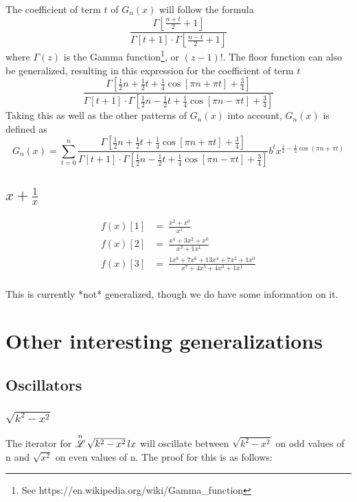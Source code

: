 \documentclass[12pt, letterpaper]{article}
\begin{document}
The coefficient of term $t$ of $G_n(x)$ will follow the formula
$$\frac{\Gamma \left \lfloor \frac{n+t}{2} +1\right \rfloor}{\Gamma [t+1] \cdot \Gamma \left \lfloor \frac{n-t}{2} +1\right \rfloor}$$
where $\Gamma (z)$ is the Gamma function\footnote{See https://en.wikipedia.org/wiki/Gamma\_function}, or $(z-1)!$. The floor function can also be generalized, resulting in this expression for the coefficient of term $t$
$$\frac{\Gamma[\frac{1}{2}n+\frac{1}{2}t+\frac{1}{4}\cos[\pi n+\pi t]+\frac{3}{4}]}{\Gamma[t+1]\cdot \Gamma[\frac{1}{2}n-\frac{1}{2}t+\frac{1}{4}\cos[\pi n-\pi t]+\frac{3}{4}]}$$
Taking this as well as the other patterns of $G_n(x)$ into account, $G_n(x)$ is defined as
$$G_n(x) = \sum_{t=0}^{n}\frac{\Gamma[\frac{1}{2}n+\frac{1}{2}t+\frac{1}{4}\cos[\pi n+\pi t]+\frac{3}{4}]}{\Gamma[t+1]\cdot \Gamma[\frac{1}{2}n-\frac{1}{2}t+\frac{1}{4}\cos[\pi n-\pi t]+\frac{3}{4}]}b^{t}x^{\frac{1}{2}-\frac{1}{2}\cos(\pi n+\pi t)}$$

\subsection{$x + \frac{1}{x}$}
\begin{equation}
    \begin{split}
        f(x)[1] & = \  \frac{x^2+x^{0}}{x^{1}}\\
        f(x)[2] & = \  \frac{x^{4} + 3 x^{2} + x^{0}}{x^{3} + 1x^{1}}\\
        f(x)[3] & = \  \frac{1x^{8}+7x^{6}+13x^{4}+7x^{2}+1x^{0}}{x^{7}+4x^{5}+4x^{3}+ 1x^{1}}\\
    \end{split}
\end{equation}

This is currently *not* generalized, though we do have some information on it.

\section{Other interesting generalizations}

\subsection{Oscillators}
\subsubsection{$\sqrt{k^2-x^2}$}
The iterator for $\overset{n}{\mathscr{L}} \, \sqrt{k^2-x^2} \, lx$ will oscillate between $\sqrt{k^2-x^2}$ on odd values of n and $\sqrt{x^2}$ on even values of n. The proof for this is as follows:
\end{document}
